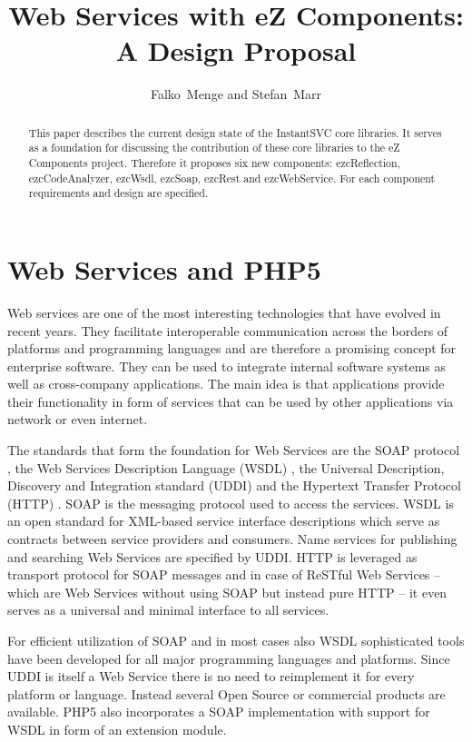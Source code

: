 \documentclass[10pt,final,a4paper,oneside]{article}
\begin{document}
\title{Web Services with eZ Components:\\ A Design Proposal}
\author{Falko~Menge and Stefan~Marr}

\maketitle


\begin{abstract}
This paper describes the current design state
of the InstantSVC core libraries.
It serves as a foundation for discussing the contribution
of these core libraries to the eZ Components project.
Therefore it proposes six new components:
ezcReflection, ezcCodeAnalyzer, ezcWsdl, ezcSoap, ezcRest and ezcWebService.
For each component requirements and design are specified.
\end{abstract}

\section{Web Services and PHP5}\label{sec:Introduction}
Web services are one of the most interesting technologies that have evolved in
recent years. They facilitate interoperable communication across the borders of 
platforms and programming languages and are therefore a
promising concept for enterprise software. They can be used to integrate 
internal software systems as well as cross-company applications. The main idea is that 
applications provide their functionality in form of services that can be 
used by other applications via network or even internet. 

The standards that form the foundation for Web Services are the SOAP
protocol \cite{SOAP}, the Web Services Description Language (WSDL) \cite{WSDL},
the Universal Description, Discovery and Integration standard (UDDI) \cite{UDDI} and the
Hypertext Transfer Protocol (HTTP) \cite{HTTP}.
SOAP is the messaging protocol used to access the services. WSDL is an
open standard for XML-based service interface descriptions which serve as
contracts between service providers and consumers. Name services for
publishing and searching Web Services are specified by UDDI. HTTP is
leveraged as transport protocol for SOAP messages and in case of ReSTful
Web Services -- which are Web Services without using SOAP but instead pure HTTP --
it even serves as a universal and minimal interface to all
services.

For efficient utilization of SOAP and in most cases also WSDL
sophisticated tools have been developed for all major programming
languages and platforms.
Since UDDI is itself a Web Service there is no need
to reimplement it for every platform or language.
Instead several Open Source or commercial products are available.
PHP5 also incorporates a SOAP implementation with support for WSDL
in form of an extension module.
\end{document}

